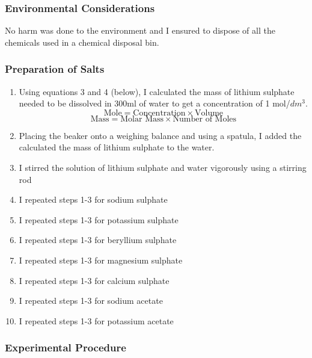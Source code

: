 \documentclass{article}
\begin{document}
\subsubsection{Environmental Considerations}

\par{No harm was done to the environment and I ensured to dispose of all the chemicals used in a chemical disposal bin.}

\subsubsection{Preparation of Salts}
    \begin{enumerate}
        \item Using equations 3 and 4 (below), I calculated the mass of lithium sulphate needed to be dissolved in 300ml of water to get a concentration of 1 mol/$dm^3$.
        \begin{equation}
        \text{Mole} = \text{Concentration} \times \text{Volume}    
        \end{equation}
        \begin{equation}
        \text{Mass} = \text{Molar~Mass} \times \text{Number~of~Moles}
        \end{equation}
        \item Placing the beaker onto a weighing balance and using a spatula, I added the calculated the mass of lithium sulphate to the water.
        \item I stirred the solution of lithium sulphate and water vigorously using a stirring rod
        \item I repeated steps 1-3 for sodium sulphate
        \item I repeated steps 1-3 for potassium sulphate
        \item I repeated steps 1-3 for beryllium sulphate
        \item I repeated steps 1-3 for magnesium sulphate
        \item I repeated steps 1-3 for calcium sulphate
        \item I repeated steps 1-3 for sodium acetate
        \item I repeated steps 1-3 for potassium acetate
    \end{enumerate}


\subsubsection{Experimental Procedure}
\end{document}
